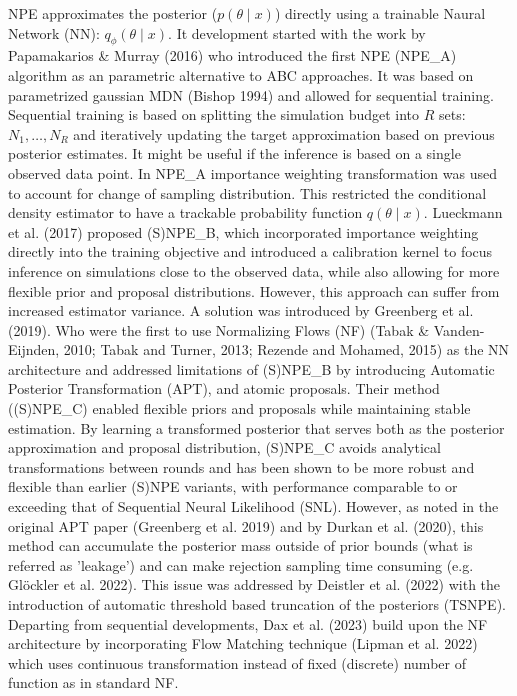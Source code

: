 \documentclass[12pt]{article}
\begin{document}
NPE approximates the posterior ($p(\theta \mid x)$) directly using a trainable Naural Network (NN): $q_\phi(\theta \mid x)$. It development started with the work by Papamakarios \& Murray (2016) who introduced the first NPE (NPE\_A) algorithm as an parametric alternative to ABC approaches. It was based on parametrized gaussian MDN (Bishop 1994) and allowed for sequential training. Sequential training is based on splitting the simulation budget into $R$ sets: $N_1, \dots, N_R$ and iteratively updating the target approximation based on previous posterior estimates. It might be useful if the inference is based on a single observed data point. In NPE\_A importance weighting transformation was used to account for change of sampling distribution. This restricted the conditional density estimator to have a trackable probability function $q(\theta \mid x)$. Lueckmann et al. (2017) proposed (S)NPE\_B, which incorporated importance weighting directly into the training objective and introduced a calibration kernel to focus inference on simulations close to the observed data, while also allowing for more flexible prior and proposal distributions. However, this approach can suffer from increased estimator variance. A solution was introduced by Greenberg et al. (2019). Who were the first to use Normalizing Flows (NF) (Tabak \& Vanden-Eijnden, 2010; Tabak and Turner, 2013; Rezende and Mohamed, 2015) as the NN architecture and addressed limitations of (S)NPE\_B by introducing Automatic Posterior Transformation (APT), and atomic proposals. Their method ((S)NPE\_C) enabled flexible priors and proposals while maintaining stable estimation. By learning a transformed posterior that serves both as the posterior approximation and proposal distribution, (S)NPE\_C avoids analytical transformations between rounds and has been shown to be more robust and flexible than earlier (S)NPE variants, with performance comparable to or exceeding that of Sequential Neural Likelihood (SNL). However, as noted in the original APT paper (Greenberg et al. 2019) and by Durkan et al. (2020), this method can accumulate the posterior mass outside of prior bounds (what is referred as 'leakage') and can make rejection sampling time consuming (e.g. Glöckler et al. 2022). This issue was addressed by Deistler et al. (2022) with the introduction of automatic threshold based truncation of the posteriors (TSNPE). Departing from sequential developments, Dax et al. (2023) build upon the NF architecture by incorporating Flow Matching technique (Lipman et al. 2022) which uses continuous transformation instead of fixed (discrete) number of function as in standard NF.
\end{document}

